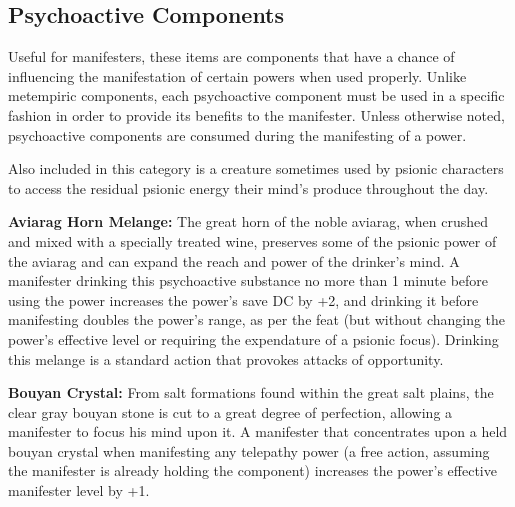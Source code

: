 \subsection{Psychoactive Components}
Useful for manifesters, these items are components that have a chance of influencing the manifestation of certain powers when used properly. Unlike metempiric components, each psychoactive component must be used in a specific fashion in order to provide its benefits to the manifester. Unless otherwise noted, psychoactive components are consumed during the manifesting of a power.

Also included in this category is a creature sometimes used by psionic characters to access the residual psionic energy their mind's produce throughout the day.


\textbf{Aviarag Horn Melange:} The great horn of the noble aviarag, when crushed and mixed with a specially treated wine, preserves some of the psionic power of the aviarag and can expand the reach and power of the drinker's mind. A manifester drinking this psychoactive substance no more than 1 minute before using the  power increases the power's save DC by +2, and drinking it before manifesting  doubles the power's range, as per the  feat (but without changing the power's effective level or requiring the expendature of a psionic focus). Drinking this melange is a standard action that provokes attacks of opportunity.

\textbf{Bouyan Crystal:} From salt formations found within the great salt plains, the clear gray bouyan stone is cut to a great degree of perfection, allowing a manifester to focus his mind upon it. A manifester that concentrates upon a held bouyan crystal when manifesting any telepathy power (a free action, assuming the manifester is already holding the component) increases the power's effective manifester level by +1.

